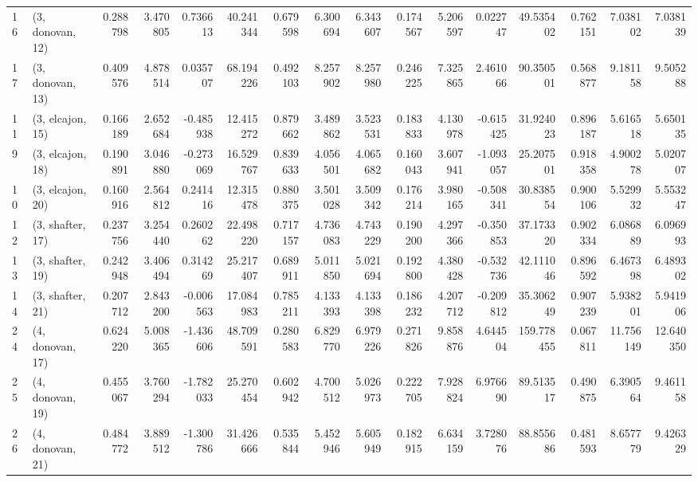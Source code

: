 \begin{tabular}{llrrrrrrrrrrrrrr}
16 &  (3, donovan, 12) &   0.288798 &  3.470805 &  0.736613 &  40.241344 &  0.679598 &   6.300694 &  6.343607 &  0.174567 &   5.206597 &  0.022747 &   49.535402 &  0.762151 &   7.038102 &   7.038139 \\
17 &  (3, donovan, 13) &   0.409576 &  4.878514 &  0.035707 &  68.194226 &  0.492103 &   8.257902 &  8.257980 &  0.246225 &   7.325865 &  2.461066 &   90.350501 &  0.568877 &   9.181158 &   9.505288 \\
11 &  (3, elcajon, 15) &   0.166189 &  2.652684 & -0.485938 &  12.415272 &  0.879662 &   3.489862 &  3.523531 &  0.183833 &   4.130978 & -0.615425 &   31.924023 &  0.896187 &   5.616518 &   5.650135 \\
9  &  (3, elcajon, 18) &   0.190891 &  3.046880 & -0.273069 &  16.529767 &  0.839633 &   4.056501 &  4.065682 &  0.160043 &   3.607941 & -1.093057 &   25.207501 &  0.918358 &   4.900278 &   5.020707 \\
10 &  (3, elcajon, 20) &   0.160916 &  2.564812 &  0.241416 &  12.315478 &  0.880375 &   3.501028 &  3.509342 &  0.176214 &   3.980165 & -0.508341 &   30.838554 &  0.900106 &   5.529932 &   5.553247 \\
12 &  (3, shafter, 17) &   0.237756 &  3.254440 &  0.260262 &  22.498220 &  0.717157 &   4.736083 &  4.743229 &  0.190200 &   4.297366 & -0.350853 &   37.173320 &  0.902334 &   6.086889 &   6.096993 \\
13 &  (3, shafter, 19) &   0.242948 &  3.406494 &  0.314269 &  25.217407 &  0.689911 &   5.011850 &  5.021694 &  0.192800 &   4.380428 & -0.532736 &   42.111046 &  0.896592 &   6.467398 &   6.489302 \\
14 &  (3, shafter, 21) &   0.207712 &  2.843200 & -0.006563 &  17.084983 &  0.785211 &   4.133393 &  4.133398 &  0.186232 &   4.207712 & -0.209812 &   35.306249 &  0.907239 &   5.938201 &   5.941906 \\
24 &  (4, donovan, 17) &   0.624220 &  5.008365 & -1.436606 &  48.709591 &  0.280583 &   6.829770 &  6.979226 &  0.271826 &   9.858876 &  4.644504 &  159.778455 &  0.067811 &  11.756149 &  12.640350 \\
25 &  (4, donovan, 19) &   0.455067 &  3.760294 & -1.782033 &  25.270454 &  0.602942 &   4.700512 &  5.026973 &  0.222705 &   7.928824 &  6.976690 &   89.513517 &  0.490875 &   6.390564 &   9.461158 \\
26 &  (4, donovan, 21) &   0.484772 &  3.889512 & -1.300786 &  31.426666 &  0.535844 &   5.452946 &  5.605949 &  0.182915 &   6.634159 &  3.728076 &   88.855686 &  0.481593 &   8.657779 &   9.426329 \\

\end{tabular}
